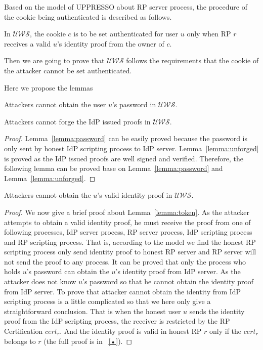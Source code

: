 Based on the model of UPPRESSO about RP server process, the procedure of the cookie being authenticated is described as follows.  
\begin{definition}
In $\mathcal{UWS}$, the cookie $c$ is to be set authenticated for user $u$ only when RP $r$ receives a valid $u$'s identity proof from the owner of $c$. 
\label{def:cookie}
\end{definition} 
Then we are going to prove that  $\mathcal{UWS}$ follows the requirements that the cookie of the attacker cannot be set authenticated. 

Here we propose the lemmas
\begin{lemma}
Attackers cannot obtain the user $u$'s password in $\mathcal{UWS}$. 
\label{lemma:password}
\end{lemma}
\begin{lemma}
Attackers cannot forge the IdP issued proofs in $\mathcal{UWS}$. 
\label{lemma:unforged}
\end{lemma}
\begin{proof}
Lemma~\ref{lemma:password} can be easily proved because the password is only sent by honest IdP scripting process to IdP server. Lemma~\ref{lemma:unforged} is proved as the IdP issued proofs are well signed and verified. Therefore, the following lemma can be proved  base on Lemma~\ref{lemma:password} and Lemma~\ref{lemma:unforged}.
\end{proof}
\begin{lemma}
Attackers cannot obtain the $u$'s valid identity proof in $\mathcal{UWS}$.
\label{lemma:token}
\end{lemma}
\begin{proof}
We now give a brief proof about Lemma~\ref{lemma:token}. As the attacker attempts to obtain a valid identity proof, he must receive the proof from one of following processes, IdP server process, RP server process, IdP scripting process and RP scripting process. That is, according to the model we find the honest RP scripting process only send identity proof to honest RP server and RP server will not send the proof to any process. It can be proved that only the process who holds $u$'s password can obtain the $u$'s identity proof from IdP server. As the attacker does not know $u$'s password so that he cannot obtain the identity proof from IdP server. To prove that attacker cannot obtain the identity from IdP scripting process is a little complicated so that we here only give a straightforward conclusion. That is when the honest user $u$ sends the identity proof from the IdP scripting process, the receiver is restricted by the RP Certification $cert_r$. And the identity proof is valid in honest RP $r$ only if the $cert_r$ belongs to $r$ (the full proof is in ~\ref{•}). 
\end{proof}


